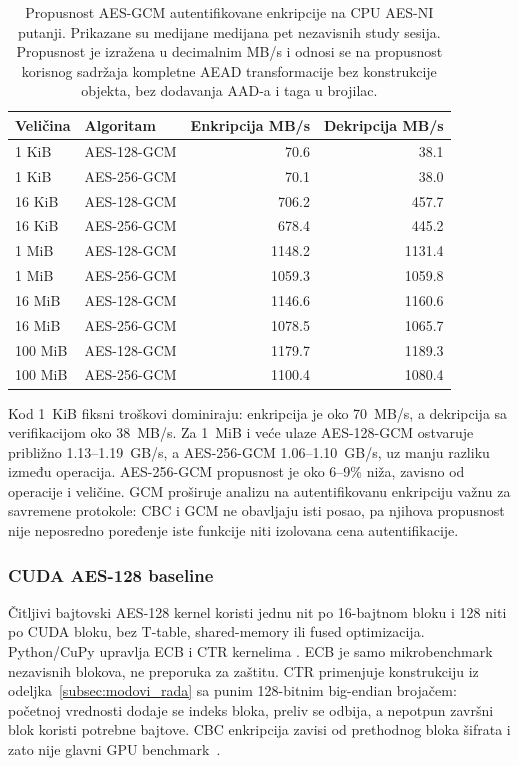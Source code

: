 \begin{table}[htbp]
\centering
\caption{Propusnost AES-GCM autentifikovane enkripcije na CPU AES-NI putanji.
Prikazane su medijane medijana pet nezavisnih study sesija. Propusnost je
izražena u decimalnim MB/s i odnosi se na propusnost korisnog sadržaja kompletne AEAD
transformacije bez konstrukcije objekta, bez dodavanja AAD-a i taga u brojilac.}
\label{tab:aes-gcm-rezultati}
\begin{tabular}{llrr}
\toprule
Veličina & Algoritam & Enkripcija MB/s & Dekripcija MB/s \\
\midrule
1 KiB   & AES-128-GCM & 70.6   & 38.1 \\
1 KiB   & AES-256-GCM & 70.1   & 38.0 \\
16 KiB  & AES-128-GCM & 706.2  & 457.7 \\
16 KiB  & AES-256-GCM & 678.4  & 445.2 \\
1 MiB   & AES-128-GCM & 1148.2 & 1131.4 \\
1 MiB   & AES-256-GCM & 1059.3 & 1059.8 \\
16 MiB  & AES-128-GCM & 1146.6 & 1160.6 \\
16 MiB  & AES-256-GCM & 1078.5 & 1065.7 \\
100 MiB & AES-128-GCM & 1179.7 & 1189.3 \\
100 MiB & AES-256-GCM & 1100.4 & 1080.4 \\
\bottomrule
\end{tabular}
\end{table}

Kod 1~KiB fiksni troškovi dominiraju: enkripcija je oko 70~MB/s, a
dekripcija sa verifikacijom oko 38~MB/s. Za 1~MiB i veće ulaze AES-128-GCM
ostvaruje približno 1.13--1.19~GB/s, a AES-256-GCM 1.06--1.10~GB/s,
uz manju razliku između operacija. AES-256-GCM propusnost je oko
6--9\% niža, zavisno od operacije i veličine. GCM proširuje analizu na
autentifikovanu enkripciju važnu za savremene protokole: CBC i GCM ne
obavljaju isti posao, pa njihova propusnost nije neposredno poređenje
iste funkcije niti izolovana cena autentifikacije.

\subsubsection{CUDA AES-128 baseline}
\label{sec:aes-gpu}
\label{sec:rezultati-cuda-baseline}
Čitljivi bajtovski AES-128 kernel koristi jednu nit po 16-bajtnom bloku
i 128 niti po CUDA bloku, bez T-table, shared-memory ili fused
optimizacija. Python/CuPy upravlja ECB i CTR kernelima
\cite{nvidia-cuda-model,nvidia-cuda-python,cupy-rawkernel}.
ECB je samo mikrobenchmark nezavisnih blokova, ne preporuka za zaštitu.
CTR primenjuje konstrukciju iz odeljka~\ref{subsec:modovi_rada} sa punim
128-bitnim big-endian brojačem: početnoj vrednosti dodaje se indeks bloka,
preliv se odbija, a nepotpun završni blok koristi potrebne bajtove.
CBC enkripcija zavisi od prethodnog bloka šifrata i zato nije glavni
GPU benchmark~\cite{sp800-38a}.

